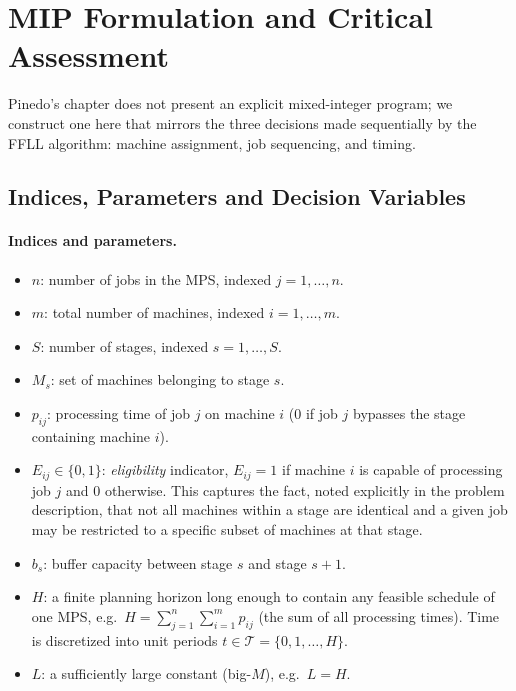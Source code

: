 \documentclass[11pt,a4paper]{article}
\begin{document}
\section{MIP Formulation and Critical Assessment}

Pinedo's chapter does not present an explicit mixed-integer program; we
construct one here that mirrors the three decisions made sequentially by
the FFLL algorithm: machine assignment, job sequencing, and timing.

\subsection{Indices, Parameters and Decision Variables}

\paragraph{Indices and parameters.}
\begin{itemize}
  \item $n$: number of jobs in the MPS, indexed $j=1,\dots,n$.
  \item $m$: total number of machines, indexed $i=1,\dots,m$.
  \item $S$: number of stages, indexed $s=1,\dots,S$.
  \item $M_s$: set of machines belonging to stage $s$.
  \item $p_{ij}$: processing time of job $j$ on machine $i$ ($0$ if job $j$
    bypasses the stage containing machine $i$).
  \item $E_{ij} \in \{0,1\}$: \emph{eligibility} indicator, $E_{ij}=1$ if
    machine $i$ is capable of processing job $j$ and $0$ otherwise. This
    captures the fact, noted explicitly in the problem description, that
    not all machines within a stage are identical and a given job may be
    restricted to a specific subset of machines at that stage.
  \item $b_s$: buffer capacity between stage $s$ and stage $s+1$.
  \item $H$: a finite planning horizon long enough to contain any feasible
    schedule of one MPS, e.g.\ $H = \sum_{j=1}^n \sum_{i=1}^m p_{ij}$ (the
    sum of all processing times). Time is discretized into unit periods
    $t \in \mathcal{T} = \{0,1,\dots,H\}$.
  \item $L$: a sufficiently large constant (big-$M$), e.g.\ $L = H$.
\end{itemize}
\end{document}

